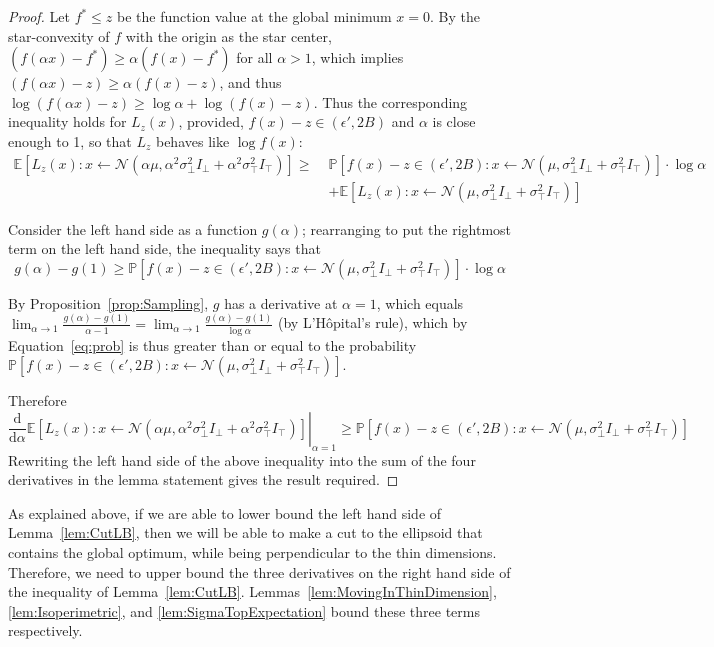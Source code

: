 \documentclass[11pt,letter]{article}
\renewcommand{\Pr}{\mathbb{P}}
\newcommand{\Exp}{\mathbb{E}}
\newcommand{\from}{\leftarrow}
\newcommand{\Normal}{\mathcal{N}}
\renewcommand{\d}{\mathrm{d}}
\newcommand{\Diff}[2][]{\frac{\d#1}{\d#2}}
\numberwithin{nTheorems}{section}
\begin{document}
\begin{proof}
Let $f^\ast\leq z$ be the function value at the global minimum $x=0$. By the star-convexity of $f$ with the origin as the star center, $(f(\alpha x)-f^\ast) \ge \alpha (f(x)-f^\ast)$ for all $\alpha > 1$, which implies $(f(\alpha x)-z) \ge \alpha (f(x)-z)$, and thus $\log (f(\alpha x)-z)\ge \log\alpha+\log (f(x)-z)$. Thus the corresponding inequality holds for $L_z(x)$, provided, $f(x)-z\in (\epsilon',2B)$ and $\alpha$ is close enough to 1, so that $L_z$ behaves like $\log f(x)$:
\begin{align*}
\Exp\left[L_z(x) : x \from \Normal(\alpha \mu, \alpha^2\sigma_\bot^2 I_\bot + \alpha^2\sigma_\top^2 I_\top) \right] \geq\;&\Pr[f(x)-z\in (\epsilon',2B) :x \from \Normal(\mu, \sigma_\bot^2 I_\bot + \sigma_\top^2 I_\top)] \cdot   \log \alpha\\&+\Exp\left[L_z(x) : x \from \Normal(\mu, \sigma_\bot^2 I_\bot + \sigma_\top^2 I_\top) \right]\end{align*}

Consider the left hand side as a function $g(\alpha)$; rearranging to put the rightmost term on the left hand side, the inequality says that \begin{equation}\label{eq:prob}g(\alpha)-g(1)\geq \Pr[f(x)-z\in (\epsilon',2B) :x \from \Normal(\mu, \sigma_\bot^2 I_\bot + \sigma_\top^2 I_\top)] \cdot   \log \alpha\end{equation}

By Proposition~\ref{prop:Sampling}, $g$ has a derivative at $\alpha=1$, which equals $\lim_{\alpha\to 1}\frac{g(\alpha)-g(1)}{\alpha-1}=\lim_{\alpha\to 1}\frac{g(\alpha)-g(1)}{\log \alpha}$ (by L'H\^{o}pital's rule), which by Equation~\ref{eq:prob} is thus greater than or equal to the probability $\Pr[f(x)-z\in (\epsilon',2B) :x \from \Normal(\mu, \sigma_\bot^2 I_\bot + \sigma_\top^2 I_\top)]$.



Therefore
$$ \left.\Diff{\alpha} \Exp\left[L_z(x) : x \from \Normal(\alpha \mu, \alpha^2\sigma_\bot^2 I_\bot + \alpha^2\sigma_\top^2 I_\top) \right]\right|_{\alpha = 1} \ge \Pr[f(x)-z\in (\epsilon',2B)  : x \from \Normal(\mu, \sigma_\bot^2 I_\bot + \sigma_\top^2 I_\top)] $$
Rewriting the left hand side of the above inequality into the sum of the four derivatives in the lemma statement gives the result required.
\end{proof}

As explained above, if we are able to lower bound the left hand side of Lemma~\ref{lem:CutLB}, then we will be able to make a cut to the ellipsoid that contains the global optimum, while being perpendicular to the thin dimensions.
Therefore, we need to upper bound the three derivatives on the right hand side of the inequality of Lemma~\ref{lem:CutLB}.
Lemmas~\ref{lem:MovingInThinDimension}, \ref{lem:Isoperimetric}, and \ref{lem:SigmaTopExpectation} bound these three terms respectively.
\end{document}
